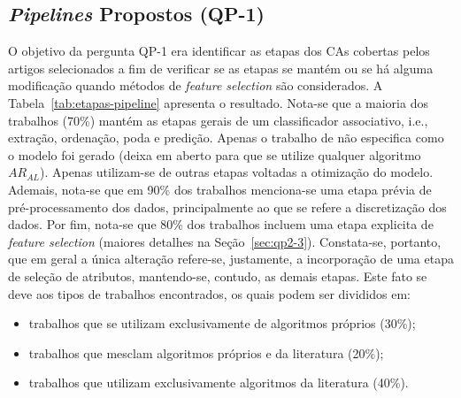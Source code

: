 \subsection{\textit{Pipelines} Propostos (QP-1)}\label{sec:qp1}
O objetivo da pergunta QP-1 era identificar as etapas dos CAs cobertas pelos artigos selecionados a fim de verificar se as etapas se mantém ou se há alguma modificação quando métodos de \textit{feature selection} são considerados. A Tabela~\ref{tab:etapas-pipeline} apresenta o resultado. Nota-se que a maioria dos trabalhos (70\%) mantém as etapas gerais de um classificador associativo, i.e., extração, ordenação, poda e predição. Apenas o trabalho de  não especifica como o modelo foi gerado (deixa em aberto para que se utilize qualquer algoritmo $AR_{AL}$). Apenas  utilizam-se de outras etapas voltadas a otimização do modelo. Ademais, nota-se que em 90\% dos trabalhos menciona-se uma etapa prévia de pré-processamento dos dados, principalmente ao que se refere a discretização dos dados. Por fim, nota-se que 80\% dos trabalhos incluem uma etapa explicita de \textit{feature selection} (maiores detalhes na Seção~\ref{sec:qp2-3}). Constata-se, portanto, que em geral a única alteração refere-se, justamente, a incorporação de uma etapa de seleção de atributos, mantendo-se, contudo, as demais etapas. Este fato se deve aos tipos de trabalhos encontrados, os quais podem ser divididos em:
\begin{itemize}
    \item trabalhos que se utilizam exclusivamente de algoritmos próprios \cite{wu2024novel,gayathri2015efficient,sowan2023hybrid} (30\%);
    \item trabalhos que mesclam algoritmos próprios e da literatura \cite{nandhini2020performance,alhawari2021classification} (20\%);
    \item trabalhos que utilizam exclusivamente algoritmos da literatura \cite{cicek2021assessment,ashi2021enhancing,alazaidah2021feature,piri2019exploring} (40\%).
\end{itemize}


